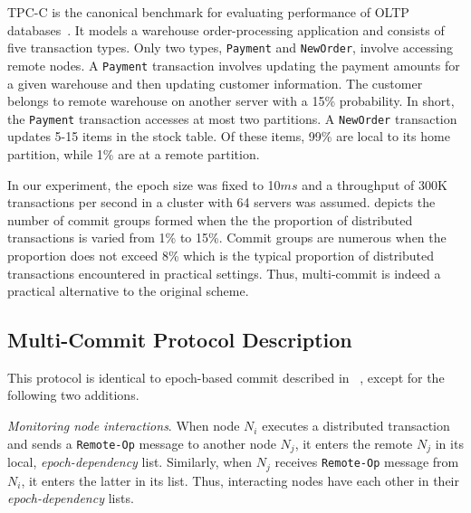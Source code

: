 TPC-C is the canonical benchmark for evaluating performance of OLTP
databases~\cite{tpcc}.
It models a warehouse order-processing application and consists of five transaction types.
Only two types, \texttt{Payment} and \texttt{NewOrder}, involve accessing remote nodes.
A \texttt{Payment} transaction involves updating the payment amounts for a given
warehouse and then updating customer information.
The customer belongs to remote warehouse on another server with a 15\% probability.
In short, the \texttt{Payment} transaction accesses at most two partitions.
A \texttt{NewOrder} transaction updates 5-15 items in the stock table.
Of these items, 99\% are local to its home partition, while 1\% are at a remote partition.



In our experiment, the epoch size was fixed to 10$ms$ and a throughput of 300K transactions
per second in a cluster with 64 servers was assumed.
 depicts the number of commit groups formed when the the proportion of distributed transactions is varied from 1\%
to 15\%.
Commit groups are numerous when the proportion 
does not exceed 8\% which is the typical proportion of distributed transactions encountered in practical settings. %
Thus, multi-commit is indeed a practical alternative to the original scheme.

\subsection{Multi-Commit Protocol Description}
\label{sec:ebmc-protocol-description}

This protocol is identical to epoch-based commit described in ~, except for the following two additions.

\textit{Monitoring node interactions}. When node $N_i$ executes a distributed transaction and sends a \texttt{Remote-Op} message to another node $N_j$, it enters the remote $N_j$ in its local,  \textit{epoch-dependency} list. Similarly, when $N_j$ receives \texttt{Remote-Op} message from $N_i$, it enters the latter in its list. Thus, interacting nodes have each other in their \textit{epoch-dependency} lists.

